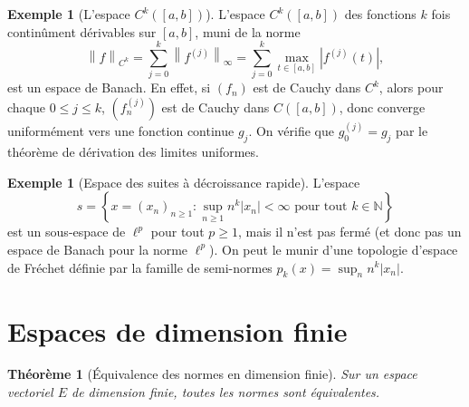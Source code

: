 \documentclass[a4paper,12pt]{book}
\newcommand{\N}{\mathbb{N}}
\newcommand{\norm}[1]{\left\| #1 \right\|}
\newcommand{\abs}[1]{\left| #1 \right|}
\theoremstyle{definition}
\newtheorem{exemple}[definition]{Exemple}
\theoremstyle{plain}
\newtheorem{theoreme}[definition]{Théorème}
\theoremstyle{remark}
\begin{document}
\begin{exemple}[{L'espace $C^k([a,b])$}]\label{ex:Ck}
L'espace $C^k([a,b])$ des fonctions $k$ fois continûment dérivables sur $[a,b]$, muni de la norme
\[
    \norm{f}_{C^k} = \sum_{j=0}^{k} \norm{f^{(j)}}_\infty = \sum_{j=0}^{k} \max_{t \in [a,b]} \abs{f^{(j)}(t)},
\]
est un espace de Banach. En effet, si $(f_n)$ est de Cauchy dans $C^k$, alors pour chaque $0 \leq j \leq k$, $(f_n^{(j)})$ est de Cauchy dans $C([a,b])$, donc converge uniformément vers une fonction continue $g_j$. On vérifie que $g_0^{(j)} = g_j$ par le théorème de dérivation des limites uniformes.
\end{exemple}

\begin{exemple}[Espace des suites à décroissance rapide]\label{ex:schwartz-discret}
L'espace
\[
    s = \left\{ x = (x_n)_{n \geq 1} : \sup_{n \geq 1} n^k \abs{x_n} < \infty \text{ pour tout } k \in \N \right\}
\]
est un sous-espace de $\ell^p$ pour tout $p \geq 1$, mais il n'est pas fermé (et donc pas un espace de Banach pour la norme $\ell^p$). On peut le munir d'une topologie d'espace de Fréchet définie par la famille de semi-normes $p_k(x) = \sup_n n^k\abs{x_n}$.
\end{exemple}

\section{Espaces de dimension finie}

\begin{theoreme}[Équivalence des normes en dimension finie]\label{thm:equiv-normes-dim-finie}
Sur un espace vectoriel $E$ de dimension finie, toutes les normes sont équivalentes.
\end{theoreme}
\end{document}
